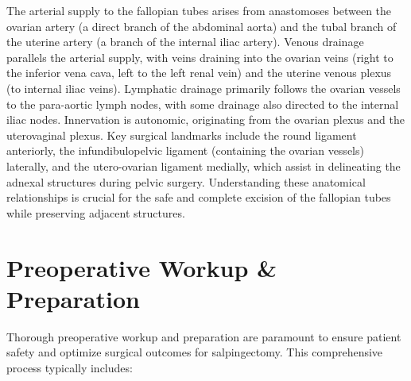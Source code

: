 The arterial supply to the fallopian tubes arises from anastomoses between the ovarian artery (a direct branch of the abdominal aorta) and the tubal branch of the uterine artery (a branch of the internal iliac artery). Venous drainage parallels the arterial supply, with veins draining into the ovarian veins (right to the inferior vena cava, left to the left renal vein) and the uterine venous plexus (to internal iliac veins). Lymphatic drainage primarily follows the ovarian vessels to the para-aortic lymph nodes, with some drainage also directed to the internal iliac nodes. Innervation is autonomic, originating from the ovarian plexus and the uterovaginal plexus. Key surgical landmarks include the round ligament anteriorly, the infundibulopelvic ligament (containing the ovarian vessels) laterally, and the utero-ovarian ligament medially, which assist in delineating the adnexal structures during pelvic surgery. Understanding these anatomical relationships is crucial for the safe and complete excision of the fallopian tubes while preserving adjacent structures.

\section*{Preoperative Workup \& Preparation}
Thorough preoperative workup and preparation are paramount to ensure patient safety and optimize surgical outcomes for salpingectomy. This comprehensive process typically includes:

